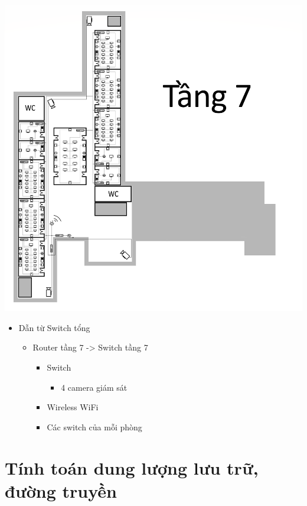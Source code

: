 \documentclass[12pt]{report}
\begin{document}
		\begin{center}
			\includegraphics[scale=0.09]{h6-f7.png} \\
		\end{center}
		
		\newpage
		\begin{itemize}
			\item Dẫn từ Switch tổng
			\begin{itemize}
				\item Router tầng 7 -> Switch tầng 7
				\begin{itemize}
					\item Switch
					\begin{itemize}
						\item 4 camera giám sát
					\end{itemize}
					\item Wireless WiFi
					\item Các switch của mỗi phòng
				\end{itemize}					
			\end{itemize}
			
		\end{itemize}




\section{Tính toán dung lượng lưu trữ, đường truyền}
\end{document}
